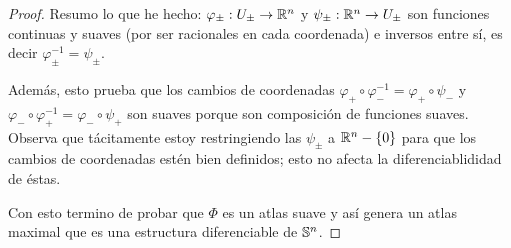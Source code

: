 \begin{proof}
  Resumo lo que he hecho: $\varphi_{\pm}:U_{\pm}\rightarrow\mathbb{R}^n$ y $\psi_{\pm}:\mathbb{R}^n\rightarrow U_{\pm}$ son funciones
  continuas y suaves (por ser racionales en cada coordenada) e inversos entre s\'i, es decir
  $\varphi_{\pm}^{-1}=\psi_{\pm}$.

  Adem\'as, esto prueba que los cambios de coordenadas
  $\varphi_+\circ\varphi_-^{-1}=\varphi_+\circ\psi_-$ y
  $\varphi_-\circ\varphi_+^{-1}=\varphi_-\circ\psi_+$ son suaves porque son composici\'on de
  funciones suaves. Observa que t\'acitamente estoy restringiendo las $\psi_{\pm}$ a $\mathbb{R}^n-\{0\}$
  para que los cambios de coordenadas est\'en bien definidos; esto no afecta la diferenciablididad
  de \'estas.

  Con esto termino de probar que $\Phi$ es un atlas suave y as\'i genera un atlas maximal que
  es una estructura diferenciable de $\mathbb{S}^n$.
\end{proof}%

